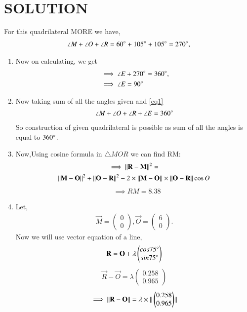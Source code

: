 \documentclass[journal,12pt,twocolumn]{IEEEtran}
\newcommand{\myvec}[1]{\ensuremath{\begin{pmatrix}#1\end{pmatrix}}}
\begin{document}
\section{SOLUTION}
For this quadrilateral MORE we have,
\begin{align}
\angle M +\angle O +\angle R = 60\degree + 105\degree + 105\degree=270\degree,
\end{align}
\begin{enumerate}
    \item Now on calculating, we get
\begin{align}
&\implies \angle E + 270\degree  = 360\degree,
\\
&\implies \angle E = 90\degree\label{eq1}
\end{align}
 \item Now taking sum of all the angles given and \eqref{eq1}  
\begin{align}
\angle M + \angle O +\angle R +\angle E =360\degree
\end{align}
So construction of given quadrilateral is possible as sum of all the angles is equal to $360\degree$.\\
 \item Now,Using cosine formula in $\triangle MOR$ we can find RM:
\begin{multline}
\implies {\Vert\mathbf{R}-\mathbf{M}\rVert^2}=
\\
{\Vert\mathbf{M}-\mathbf{O}\rVert^2}+ \Vert\mathbf{O}-\mathbf{R}\rVert^2-2\times\Vert\mathbf{M}-\mathbf{O}\rVert \times \Vert\mathbf{O}-\mathbf{R}\rVert\cos{O}
\end{multline}
\begin{align}
&\implies RM=8.38
\end{align}
\item Let, \begin{align}
\vec{M}= \myvec{0\\0}, \vec{O}= \myvec{6\\0}.
\end{align}
Now we will use vector equation of a line,
\begin{align}
    \vec{R}= \vec{O}+ \lambda \myvec{cos75\degree \\ sin75\degree}
\end{align}
\begin{align}
    \vec{R}-\vec{O}= \lambda \myvec{0.258\\0.965}
\end{align}
\begin{align}
    \implies {\norm{\vec{R}-\vec{O}}}= \lambda \times{\norm{\myvec{0.258\\0.965}}}

\end{align}
\end{enumerate}
\end{document}
